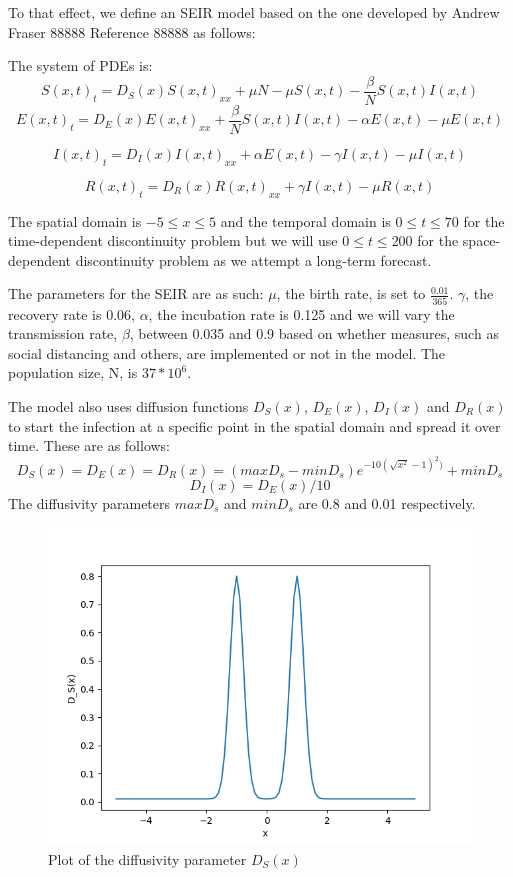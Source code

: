 \documentclass{article}
\begin{document}
To that effect, we define an SEIR model based on the one developed by Andrew Fraser 88888 Reference 88888 as follows:

The system of PDEs is:
\begin{equation}
S(x, t)_t = D_S(x)S(x, t)_{xx} + \mu N - \mu S(x, t) - \frac{\beta}{N}S(x, t)I(x, t)
\end{equation}
\begin{equation}
E(x, t)_t = D_E(x)E(x, t)_{xx} + \frac{\beta}{N}S(x, t)I(x, t) - \alpha E(x, t) - \mu E(x, t)
\end{equation}

\begin{equation}
I(x, t)_t = D_I(x)I(x, t)_{xx} + \alpha E(x, t) - \gamma I(x, t) - \mu I(x, t)
\end{equation}

\begin{equation}
R(x, t)_t = D_R(x)R(x, t)_{xx} + \gamma I(x, t) - \mu R(x, t)
\end{equation} 

The spatial domain is $-5 \leq x \leq 5$ and the temporal domain is $0 \leq t \leq 70$ for the time-dependent discontinuity problem but we will use $0 \leq t \leq 200$ for the space-dependent discontinuity problem as we attempt a long-term forecast.

The parameters for the SEIR are as such: $\mu$, the birth rate, is set to $\frac{0.01}{365}$. $\gamma$, the recovery rate is 0.06, $\alpha$, the incubation rate is 0.125 and we will vary the transmission rate, $\beta$, between 0.035 and 0.9 based on whether measures, such as social distancing and others, are implemented or not in the model. The population size, N, is $37*10^{6}$.

The model also uses diffusion functions $D_S(x)$, $D_E(x)$, $D_I(x)$ and $D_R(x)$ to start the infection at a specific point in the spatial domain and spread it over time. These are as follows:
\begin{equation}
D_S(x) = D_E(x) = D_R(x) = (maxD_s - minD_s)e^{-10(\sqrt{x^{2}} - 1)^2)} + minD_s
\end{equation} 
\begin{equation}
D_I(x) = D_E(x)/10
\end{equation}
The diffusivity parameters $maxD_s$ and $minD_s$ are 0.8 and 0.01 respectively. 

\begin{figure}[H]
\centering
\includegraphics[width=0.7\linewidth]{./figures/pde_D_s}
\caption{Plot of the diffusivity parameter $D_S(x)$}
\label{fig:pde_D_s}
\end{figure}
\end{document}
